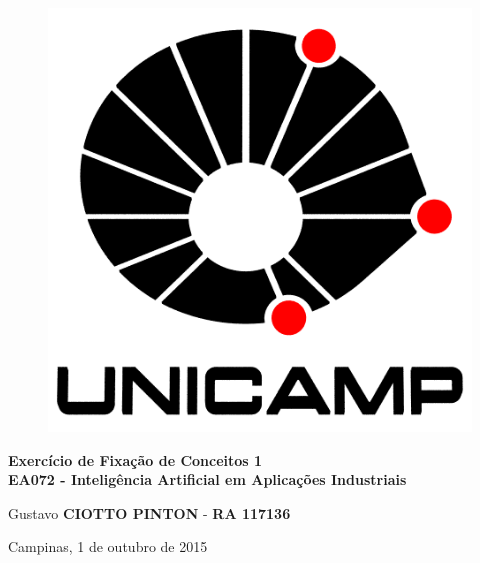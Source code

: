 \begin{titlepage}
\vspace*{.28\textheight}
\begin{center}
%
\begin{figure}[h]
    \centering
    \includegraphics[scale=0.18]{image/LogoUnicamp}
\end{figure} 
%
\vspace*{10pt}
\textbf{\LARGE Exercício de Fixação de Conceitos 1} \\ \vspace{12pt}
\textbf{\large EA072 - Inteligência Artificial em Aplicações Industriais}
\vspace*{72pt}

Gustavo \textbf{CIOTTO PINTON} - \textbf{RA 117136}
 

Campinas, 1 de outubro de 2015

\end{center}
\end{titlepage}

\newpage